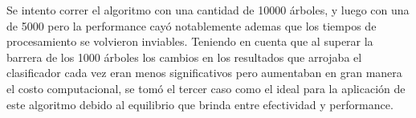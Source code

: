 Se intento correr el algoritmo con una cantidad de 10000 árboles, y luego con una de 5000 pero la performance cayó notablemente ademas que los tiempos de procesamiento se volvieron inviables.
Teniendo en cuenta que al superar la barrera de los 1000 árboles los cambios en los resultados que arrojaba el clasificador cada vez eran menos significativos pero aumentaban en gran manera el costo computacional, se tomó el tercer caso como el ideal para la aplicación de este algoritmo debido al equilibrio que brinda entre efectividad y performance.
